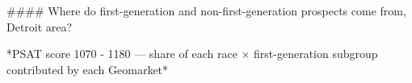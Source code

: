 #### Where do first-generation and non-first-generation prospects come from, Detroit area?

*PSAT score 1070 - 1180 — share of each race × first-generation subgroup contributed by each Geomarket*
